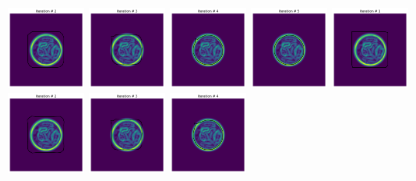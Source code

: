 \documentclass[24pt]{article}
\begin{document}
\begin{figure}[h!]
    \includegraphics[width=0.18\textwidth]{it_2_alph_10_bet_0.png}
      \includegraphics[width=0.18\textwidth]{it_3_alph_10_bet_0.png}
        \includegraphics[width=0.18\textwidth]{it_4_alph_10_bet_0.png}
          \includegraphics[width=0.18\textwidth]{it_5_alph_10_bet_0.png}          
  \includegraphics[width=0.18\textwidth]{it_1_alph_0_bet_10.png}
    \includegraphics[width=0.18\textwidth]{it_2_alph_0_bet_10.png}
      \includegraphics[width=0.18\textwidth]{it_3_alph_0_bet_10.png}
        \includegraphics[width=0.18\textwidth]{it_4_alph_0_bet_10.png}

\end{figure}
\end{document}
